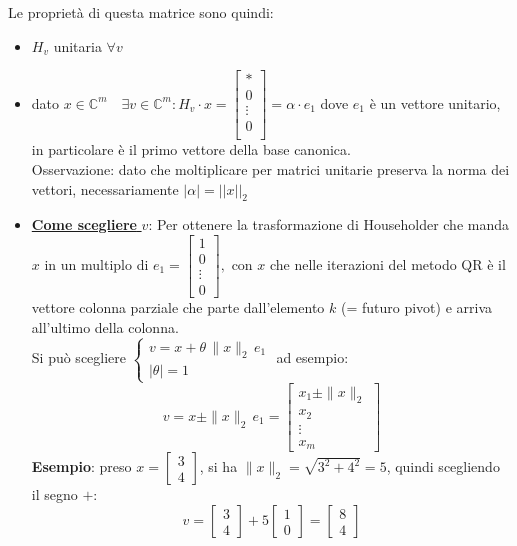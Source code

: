 \documentclass[12pt,a4paper,]{report}
\begin{document}
\noindent
Le proprietà di questa matrice sono quindi:
\begin{itemize}
    \item $H_v$ unitaria $\forall v$
    \item dato $x\in\mathbb{C}^m \quad \exists v\in\mathbb{C}^m : H_v\cdot x = 
    \left[
    \begin{array}{c}
         *\\[-10pt]
         0\\[-10pt]
         \vdots\\[-10pt]
         0\\
    \end{array} 
    \right]
    = \alpha \cdot e_1
    $ 
    dove $e_1$ è un vettore unitario, in particolare è il  primo vettore della base canonica.\\
    Osservazione: dato che moltiplicare per matrici unitarie preserva la norma dei vettori, necessariamente $|\alpha| = ||x||_2$
    \item \uline{\textbf{Come scegliere} $v$}: Per ottenere la trasformazione di Householder che manda $x$ in un multiplo di
    $
    e_1 =
    \begin{bmatrix}
    1 \\[-10pt] 0 \\[-10pt] \vdots \\[-10pt] 0
    \end{bmatrix},
    $
    con $x$ che nelle iterazioni del metodo QR è il vettore colonna parziale che parte dall'elemento $k$ (= futuro pivot) e arriva all'ultimo della colonna.\\
    Si pu\`o scegliere 
    $
    \begin{cases}
    v = x + \theta \, \|x\|_2 \, e_1\\
    |\theta| = 1
    \end{cases}
     $
    ad esempio:
    \[
    v = x \pm \|x\|_2 \, e_1
    =
    \begin{bmatrix}
    x_1 \pm \|x\|_2 \\[-10pt]
    x_2 \\[-10pt]
    \vdots \\[-10pt]
    x_m
    \end{bmatrix}
    \]
    \textbf{Esempio}: preso $x = \begin{bmatrix} 3 \\[-10pt] 4 \end{bmatrix}$, si ha $\|x\|_2 = \sqrt{3^2+4^2} = 5$, quindi scegliendo il segno $+$:
    \[
    v = \begin{bmatrix} 3 \\[-10pt] 4 \end{bmatrix} + 5 \begin{bmatrix} 1 \\[-10pt] 0 \end{bmatrix} = \begin{bmatrix} 8 \\[-10pt] 4 \end{bmatrix}
\]
\end{itemize}
\end{document}
